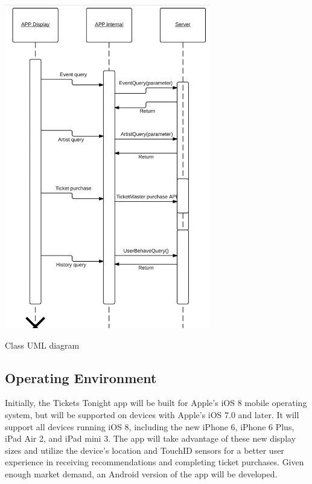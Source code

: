 		 \begin{center}
		 	\includegraphics[width=90mm]{./class_diagram.png}\\	{\footnotesize Class UML diagram\par}
		 \end{center}
		 \subsection{Operating Environment}
		 Initially, the Tickets Tonight app will be built for Apple’s iOS 8 mobile operating system, but will be supported on devices with Apple’s iOS 7.0 and later. It will support all devices running iOS 8, including the new iPhone 6, iPhone 6 Plus, iPad Air 2, and iPad mini 3.  The app will take advantage of these new display sizes and utilize the device’s location and TouchID sensors for a better user experience in receiving recommendations and completing ticket purchases. Given enough market demand, an Android version of the app will be developed. 